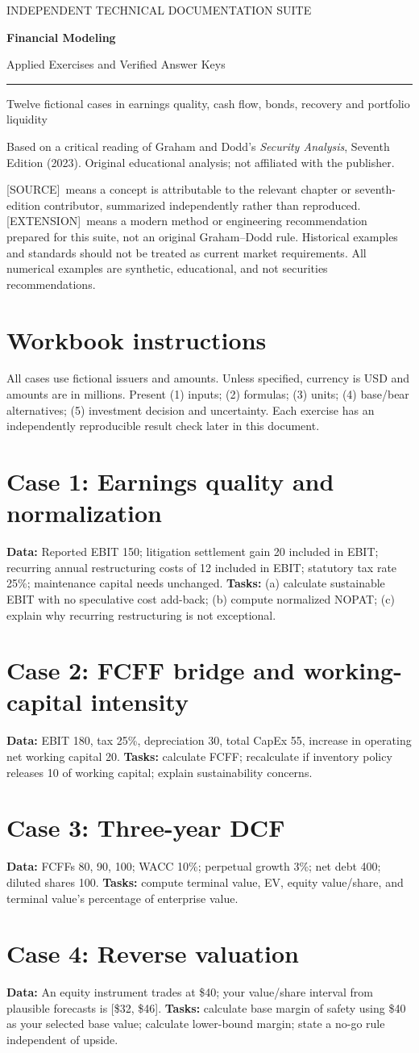 \documentclass[11pt,letterpaper]{article}
\newcommand{\src}{\textsf{\color{sea}[SOURCE]}}
\newcommand{\ext}{\textsf{\color{gold}[EXTENSION]}}
\newcommand{\cover}[3]{%
\hypersetup{pageanchor=false}%
\begin{titlepage}\pagecolor{ink}\color{white}\vspace*{1.15in}
{\sffamily\large\color{gold}INDEPENDENT TECHNICAL DOCUMENTATION SUITE\par}\vspace{0.4in}
{\Huge\sffamily\bfseries #1\par}\vspace{0.15in}
{\Large\sffamily #2\par}\vspace{0.65in}
\color{gold}\rule{\textwidth}{2pt}\par\vspace{0.4in}
{\large #3\par}\vfill
{\small\sffamily Based on a critical reading of Graham and Dodd's \emph{Security Analysis}, Seventh Edition (2023). Original educational analysis; not affiliated with the publisher.\par}
\end{titlepage}\hypersetup{pageanchor=true}\nopagecolor\color{black}}
\newcommand{\front}[3]{\cover{#1}{#2}{#3}\tableofcontents\clearpage
\begin{sourcebox}\src\ means a concept is attributable to the relevant chapter or seventh-edition contributor, summarized independently rather than reproduced. \ext\ means a modern method or engineering recommendation prepared for this suite, not an original Graham--Dodd rule. Historical examples and standards should not be treated as current market requirements. All numerical examples are synthetic, educational, and not securities recommendations.\end{sourcebox}}
\begin{document}
\front{Financial Modeling}{Applied Exercises and Verified Answer Keys}{Twelve fictional cases in earnings quality, cash flow, bonds, recovery and portfolio liquidity}

\section{Workbook instructions}
All cases use fictional issuers and amounts. Unless specified, currency is USD and amounts are in millions. Present (1) inputs; (2) formulas; (3) units; (4) base/bear alternatives; (5) investment decision and uncertainty. Each exercise has an independently reproducible result check later in this document.

\section{Case 1: Earnings quality and normalization}
\textbf{Data:} Reported EBIT 150; litigation settlement gain 20 included in EBIT; recurring annual restructuring costs of 12 included in EBIT; statutory tax rate 25\%; maintenance capital needs unchanged. \textbf{Tasks:} (a) calculate sustainable EBIT with no speculative cost add-back; (b) compute normalized NOPAT; (c) explain why recurring restructuring is not exceptional.

\section{Case 2: FCFF bridge and working-capital intensity}
\textbf{Data:} EBIT 180, tax 25\%, depreciation 30, total CapEx 55, increase in operating net working capital 20. \textbf{Tasks:} calculate FCFF; recalculate if inventory policy releases 10 of working capital; explain sustainability concerns.

\section{Case 3: Three-year DCF}
\textbf{Data:} FCFFs 80, 90, 100; WACC 10\%; perpetual growth 3\%; net debt 400; diluted shares 100. \textbf{Tasks:} compute terminal value, EV, equity value/share, and terminal value's percentage of enterprise value.

\section{Case 4: Reverse valuation}
\textbf{Data:} An equity instrument trades at \$40; your value/share interval from plausible forecasts is [\$32, \$46]. \textbf{Tasks:} calculate base margin of safety using \$40 as your selected base value; calculate lower-bound margin; state a no-go rule independent of upside.
\end{document}
